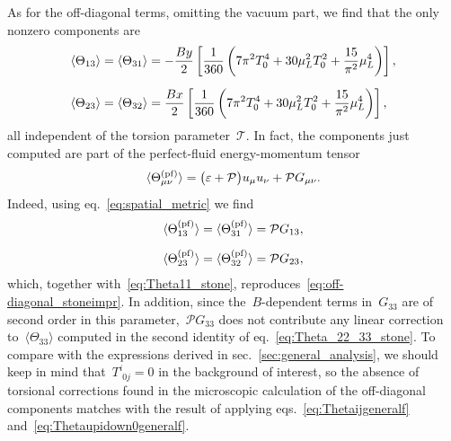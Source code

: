 \documentclass[11pt,a4paper]{article}
\begin{document}
As for the off-diagonal terms, omitting the vacuum part, we find that the only nonzero components are
\begin{align}
\langle \Theta_{13}\rangle&=\langle \Theta_{31}\rangle
=-{By\over 2}\left[
{1\over 360}\left(7\pi^{2}T_{0}^{4}
+30\mu_{L}^{2}T_{0}^{2}+{15\over \pi^{2}}\mu_{L}^{4}\right)\right], 
\nonumber \\[0.2cm]
\langle \Theta_{23}\rangle&=\langle \Theta_{32}\rangle=
{Bx\over 2}\left[
{1\over 360}\left(7\pi^{2}T_{0}^{4}
+30\mu_{L}^{2}T_{0}^{2}+{15\over \pi^{2}}\mu_{L}^{4}\right)\right],
\label{eq:off-diagonal_stoneimpr}
\end{align}
all independent of the torsion parameter~$\mathcal{T}$. In fact, the
components just computed are part of the perfect-fluid energy-momentum tensor
\begin{align}
\langle \Theta^{\rm (pf)}_{\mu\nu}\rangle=\big(\varepsilon+\mathcal{P}\big)u_{\mu}u_{\nu}
+\mathcal{P}G_{\mu\nu}.
\label{eq:pf_em_tensor_gen}
\end{align}
Indeed, using 
eq.~\eqref{eq:spatial_metric} we find
\begin{align}
\langle \Theta_{13}^{\rm (pf)}\rangle&=\langle \Theta_{31}^{\rm (pf)}\rangle
=\mathcal{P}G_{13}, \nonumber \\[0.2cm]
\langle \Theta_{23}^{\rm (pf)}\rangle&=\langle \Theta_{32}^{\rm (pf)}\rangle
=\mathcal{P}G_{23},
\end{align}
which, together with~\eqref{eq:Theta11_stone}, reproduces~\eqref{eq:off-diagonal_stoneimpr}.
In addition, 
since the~$B$-dependent terms in~$G_{33}$ are of second order in this 
parameter,~$\mathcal{P}G_{33}$ does not contribute any linear correction 
to~$\langle \Theta_{33}\rangle$ computed in
the second identity of eq.~\eqref{eq:Theta_22_33_stone}. To compare with 
the expressions derived in sec.~\ref{sec:general_analysis}, we should keep in mind 
that~$T^{i}_{\,\,0j}=0$ in the background of interest, so
the absence of torsional corrections found in the microscopic calculation  
of the off-diagonal components matches with the result of applying eqs.~\eqref{eq:Thetaijgeneralf} and~\eqref{eq:Thetaupidown0generalf}.
\end{document}
